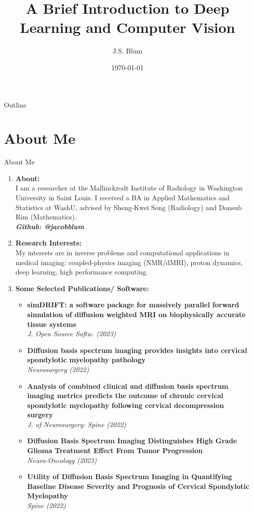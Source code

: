 \documentclass{beamer}
\title{A Brief Introduction to Deep Learning and Computer Vision}
\author{J.S. Blum}
\institute{Department of Radiology, Washington University in St. Louis School of Medicine}
\date{\today}
\begin{document}
\begin{frame}[plain]
    \titlepage
  \end{frame}

  
\begin{frame}[plain]{Outline}
  \tableofcontents
\end{frame}


\section{About Me}
\begin{frame}[plain]{About Me}


    \begin{enumerate}
        \item \textbf{About:} \mbox{}\\ I am a researcher at the Mallinckrodt Institute of Radiology in Washington University in Saint Louis. I received a BA in Applied Mathematics and Statistics at WashU, advised by Sheng-Kwei Song (Radiology) and Donsub Rim (Mathematics).  \mbox{}\\ \textbf{\textit{Github: @jacobblum}}
        \item \textbf{Research Interests:} \mbox{}\\ My interests are in inverse problems and computational applications in medical imaging: coupled-physics imaging (NMR/dMRI), proton dynamics, deep learning, high performance computing.
        \item \textbf{Some Selected Publications/ Software:} 
        
        \begin{itemize}
            \item \textbf{simDRIFT: a software package for massively parallel forward simulation of diffusion weighted MRI on biophysically accurate tissue systems} \mbox{}\\ \textit{J. Open Source Softw. (2023)}
            \item \textbf{Diffusion basis spectrum imaging provides insights into cervical spondylotic myelopathy pathology} \mbox{}\\ \textit{Neurosurgery (2022)}
            \item \textbf{Analysis of combined clinical and diffusion basis spectrum imaging metrics predicts the outcome of chronic cervical spondylotic myelopathy following cervical decompression surgery} \mbox{}\\ \textit{J. of Neurosurgery: Spine (2022)}
            \item \textbf{Diffusion Basis Spectrum Imaging Distinguishes High Grade Glioma Treatment Effect From Tumor Progression} \mbox{}\\ \textit{Neuro-Oncology (2023)}
            \item \textbf{Utility of Diffusion Basis Spectrum Imaging in Quantifying Baseline Disease Severity and Prognosis of Cervical Spondylotic Myelopathy} \mbox{}\\ \textit{Spine (2022)}
        

\end{itemize}
\end{enumerate}
\end{frame}
\end{document}
